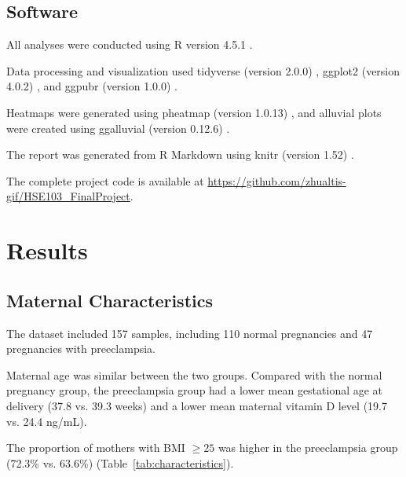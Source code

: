 \documentclass[11pt]{article}
\begin{document}
\subsection{Software}

All analyses were conducted using R version 4.5.1
\cite{r_core_team_r_2025}.

Data processing and visualization used tidyverse
(version 2.0.0) \cite{wickham_welcome_2019},
ggplot2 (version 4.0.2) \cite{wickham_ggplot2_2016},
and ggpubr (version 1.0.0)
\cite{kassambara_ggpubr_2026}.

Heatmaps were generated using pheatmap
(version 1.0.13) \cite{kolde_pheatmap_2025},
and alluvial plots were created using ggalluvial
(version 0.12.6) \cite{brunson_ggalluvial_2020}.

The report was generated from R Markdown using
knitr (version 1.52) \cite{yihui_xie_knitr_2026}.

The complete project code is available at
\url{https://github.com/zhualtis-gif/HSE103_FinalProject}.

\section{Results}

\subsection{Maternal Characteristics}

The dataset included 157 samples, including 110 normal pregnancies and 47 pregnancies with preeclampsia.

Maternal age was similar between the two groups. Compared with the normal pregnancy group, the preeclampsia group had a lower mean gestational age at delivery (37.8 vs. 39.3 weeks) and a lower mean maternal vitamin D level (19.7 vs. 24.4 ng/mL).

The proportion of mothers with BMI $\geq 25$ was higher in the preeclampsia group (72.3\% vs. 63.6\%) (Table~\ref{tab:characteristics}).
\end{document}
